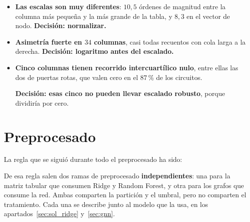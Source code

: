 \begin{itemize}
    \item \textbf{Las escalas son muy diferentes}: $10{,}5$ órdenes de magnitud entre la
          columna más pequeña y la más grande de la tabla, y $8{,}3$ en el vector de nodo.
          \textbf{Decisión: normalizar.}
    \item \textbf{Asimetría fuerte en $34$ columnas}, casi todas recuentos con cola larga a la
          derecha. \textbf{Decisión: logaritmo antes del escalado.}
    \item \textbf{Cinco columnas tienen recorrido intercuartílico nulo}, entre ellas las dos de
          puertas rotas, que valen cero en el $87$\,\% de los circuitos. 
          
          \textbf{Decisión: esas
          cinco no pueden llevar escalado robusto}, porque dividiría por cero.
\end{itemize}



\section{Preprocesado}
\label{sec:prep}

La regla que se siguió durante todo el preprocesado ha sido:

\begin{center}
\end{center}

De esa regla salen dos ramas de preprocesado \textbf{independientes}: una para la matriz
tabular que consumen Ridge y Random Forest, y otra para los grafos que consume la red. Ambas comparten la partición y el umbral, pero no comparten el tratamiento. Cada una se describe junto al modelo que la usa, en los apartados~\ref{sec:sol_ridge} y~\ref{sec:gnn}.

